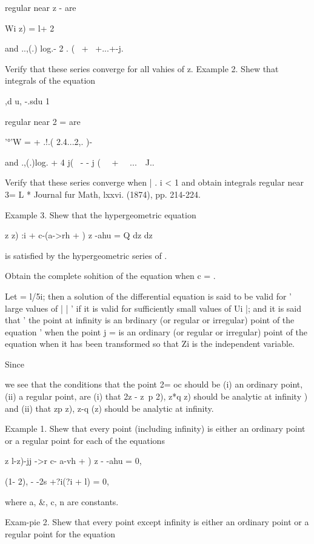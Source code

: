 regular near z - are

Wi z) = l+ 2

and ..,(.) log.- 2 . ( \ + \ +...+-j.

Verify that these series converge for all vahies of z. Example 2. Shew
that integrals of the equation

,d u, -.sdu 1

regular near 2 = are

'°'W = + .!.( 2.4...2,. )-

and .,(.)log. + 4 j( \ - - j ( \ \ + \ \ ...\ \ J..

Verify that these series converge when | . i < 1 and obtain integrals
regular near 3= L * Journal fur Math, lxxvi. (1874), pp. 214-224.

%
%

Example 3. Shew that the hypergeometric equation

z z) :i + c-(a->rh + ) z -ahu = Q dz dz

is satisfied by the hypergeometric series of .

Obtain the complete sohition of the equation when c = .


Let = l/5i; then a solution of the differential equation is said to be
valid for ' large values of | | ' if it is valid for sufficiently
small values of Ui |; and it is said that ' the point at infinity is
an brdinary (or regular or irregular) point of the equation ' when the
point j = is an ordinary (or regular or irregular) point of the
equation when it has been transformed so that Zi is the independent
variable.

Since

we see that the conditions that the point 2= oc should be (i) an
ordinary point, (ii) a regular point, are (i) that 2z - z~p 2), z*q z)
should be analytic at infinity ) and (ii) that zp z), z-q (z)
should be analytic at infinity.

Example 1. Shew that every point (including infinity) is either an
ordinary point or a regular point for each of the equations

z l-z)-jj ->r c- a-vh + ) z - -ahu = 0,

(1- 2), - -2s +?i(?i + l) = 0,

where a, \&, c, n are constants.

Exam-pie 2. Shew that every point except infinity is either an
ordinary point or a regular point for the equation

